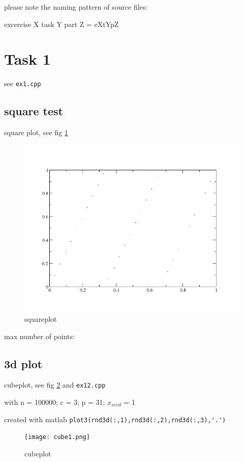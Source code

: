 please note the naming pattern of source files:

excercise X task Y part Z = eXtYpZ

\section{Task 1}
see \verb|ex1.cpp|

\subsection{square test}
square plot, see fig \ref{fig:square}
\begin{figure}[b]
  \centering
  \includegraphics[width=\textwidth]{square1.png}
  \caption{squareplot}
  \label{fig:square}
\end{figure}

max number of points:


\subsection{3d plot}
cubeplot, see fig \ref{fig:cube} and \verb|ex12.cpp|

with n = 100000; c = 3; p = 31; $x_{seed}$ = 1

created with matlab \verb|plot3(rnd3d(:,1),rnd3d(:,2),rnd3d(:,3),'.')|

\begin{figure}
  \centering
  \texttt{[image: cube1.png]}
  \caption{cubeplot}
  \label{fig:cube}
\end{figure}


